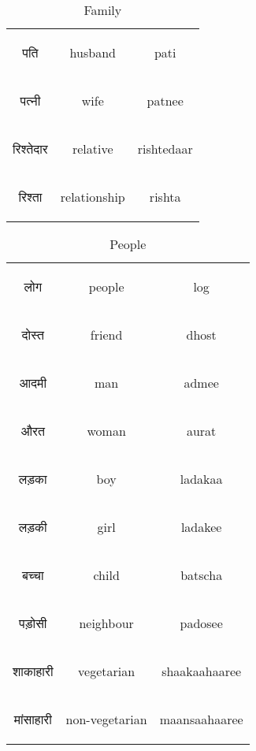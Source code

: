 \begin{table}[H]
\begin{tabular}{c|c|c}
        \begin{hindi} पति \end{hindi} & husband & pati\\
        \begin{hindi} पत्नी \end{hindi} & wife  & patnee\\
        \begin{hindi} रिश्तेदार \end{hindi} & relative  & rishtedaar\\
        \begin{hindi} रिश्ता \end{hindi} & relationship  & rishta\\
    \end{tabular}
    \caption{Family}
    \label{tab:nouns_family}
\end{table}



\begin{table}[H]
    \centering
    \begin{tabular}{c|c|c}
        \begin{hindi} लोग \end{hindi} & people & log \\
        \begin{hindi} दोस्त \end{hindi} & friend & dhost\\
        \begin{hindi} आदमी \end{hindi} & man & admee\\
        \begin{hindi} औरत \end{hindi} & woman & aurat\\
        \begin{hindi} लड़का \end{hindi} & boy & ladakaa\\
        \begin{hindi} लड़की \end{hindi} & girl & ladakee\\
        \begin{hindi} बच्चा \end{hindi} & child & batscha \\
        \begin{hindi} पड़ोसी \end{hindi} & neighbour & padosee \\
        \begin{hindi} शाकाहारी \end{hindi} & vegetarian & shaakaahaaree \\
        \begin{hindi} मांसाहारी \end{hindi} & non-vegetarian & maansaahaaree \\
    \end{tabular}
    \caption{People}
    \label{tab:nouns_people}
\end{table}


